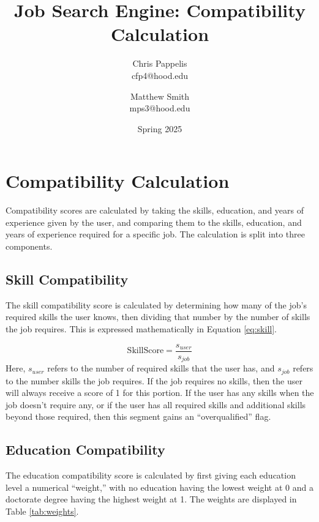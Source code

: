 \documentclass{article}
\title{Job Search Engine: Compatibility Calculation}
\author{
    Chris Pappelis\\
    cfp4@hood.edu
    \and
    Matthew Smith\\
    mps3@hood.edu
}
\date{Spring 2025}
\begin{document}
\maketitle

\section{Compatibility Calculation}

Compatibility scores are calculated by taking the skills, education, and years of experience given by the user, and comparing them to the skills, education, and years of experience required for a specific job. The calculation is split into three components.

\subsection{Skill Compatibility}

The skill compatibility score is calculated by determining how many of the job's required skills the user knows, then dividing that number by the number of skills the job requires. This is expressed mathematically in Equation \ref{eq:skill}.

\begin{equation}
    \text{SkillScore} = \frac{s_{user}}{s_{job}}
    \label{eq:skill}
\end{equation}
Here, $s_{user}$ refers to the number of required skills that the user has, and $s_{job}$ refers to the number skills the job requires. If the job requires no skills, then the user will always receive a score of 1 for this portion. If the user has any skills when the job doesn't require any, or if the user has all required skills and additional skills beyond those required, then this segment gains an ``overqualified'' flag.

\subsection{Education Compatibility}

The education compatibility score is calculated by first giving each education level a numerical ``weight,'' with no education having the lowest weight at 0 and a doctorate degree having the highest weight at 1. The weights are displayed in Table \ref{tab:weights}.
\end{document}
